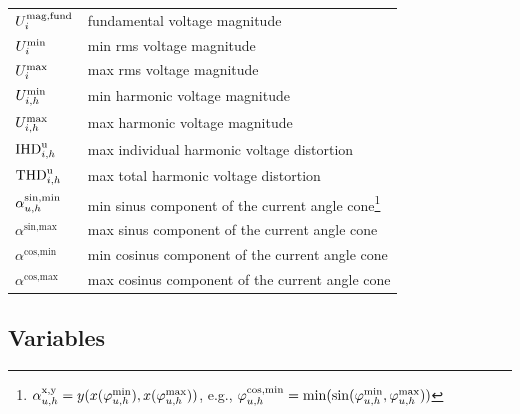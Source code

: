 \documentclass[journal]{IEEEtran}
\begin{document}
\begin{table}[H]
\begin{tabular}{l l }
        $U_{i}^{\text{mag,fund}}$                                       & fundamental voltage magnitude                     \\
        $U^{\text{min}}_{i}$                                                   & min rms voltage magnitude                         \\
        $U^{\text{max}}_{i}$                                                   & max rms voltage magnitude                         \\
        $U^{\text{min}}_{i,h}$                                         & min harmonic voltage magnitude                    \\
        $U^{\text{max}}_{i,h}$                                         & max harmonic voltage magnitude                    \\
        $\text{IHD}^{\text{u}}_{i,h}$                                   & max individual harmonic voltage distortion        \\
        $\text{THD}^{\text{u}}_{i,h}$                                   & max total harmonic voltage distortion             \\ \hline
        $\alpha^{\text{sin,min}}_{u,h}$                                 & min sinus component of the current angle cone\footnote{$\alpha^{\text{x,y}}_{u,h} = y(x(\varphi_{u,h}^{\text{min}}),x(\varphi_{u,h}^{\text{max}}))$, e.g., $\varphi_{u,h}^{\text{cos,min}} = \min(\sin(\varphi_{u,h}^{\text{min}},\varphi_{u,h}^{\text{max}}))$}       \\
        $\alpha^{\text{sin,max}}$                                                   & max sinus component of the current angle cone     \\
        $\alpha^{\text{cos,min}}$                                                   & min cosinus component of the current angle cone   \\
        $\alpha^{\text{cos,max}}$                                                   & max cosinus component of the current angle cone   \\
    \end{tabular}
\end{table}

\subsection{Variables}
\end{document}
